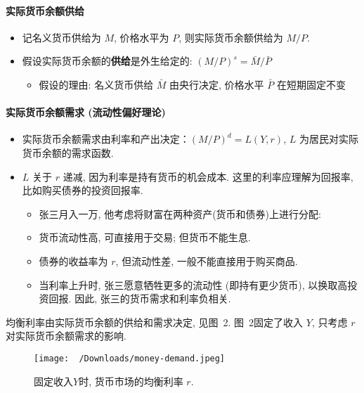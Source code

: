 \documentclass[11pt]{ctexart}
\begin{document}
\paragraph{实际货币余额供给}

\begin{itemize}
\item
  记名义货币供给为 $M$,  价格水平为 $P$,  则实际货币余额供给为 $M/P$.
\item
  假设实际货币余额的\textbf{供给}是外生给定的: $(M/P)^s = \bar{M}/ \bar{P}$
  \begin{itemize}
  \item
    假设的理由: 名义货币供给 $\bar{M}$ 由央行决定,  价格水平 $\bar{P}$ 在短期固定不变
  \end{itemize}
\end{itemize}

\paragraph{实际货币余额需求 (流动性偏好理论)}

\begin{itemize}
\item
  实际货币余额需求由利率和产出决定：$(M/P)^d = L(Y,  r)$, $L$ 为居民对实际货币余额的需求函数.
\item
  $L$ 关于 $r$ 递减, 因为利率是持有货币的机会成本. 这里的利率应理解为回报率, 比如购买债券的投资回报率.
  \begin{itemize}
  \item
    张三月入一万,  他考虑将财富在两种资产(货币和债券)上进行分配:
  \item
    货币流动性高, 可直接用于交易; 但货币不能生息.
  \item
    债券的收益率为 $r$,  但流动性差,  一般不能直接用于购买商品.
  \item
    当利率上升时, 张三愿意牺牲更多的流动性 (即持有更少货币),  以换取高投资回报. 因此, 张三的货币需求和利率负相关. 
  \end{itemize}
\end{itemize}

均衡利率由实际货币余额的供给和需求决定, 见图~2. 图~2固定了收入 $Y$,  只考虑 $r$ 对实际货币余额需求的影响.

\begin{center}
\begin{figure}[htbp]
\centering
\texttt{[image: ~/Downloads/money-demand.jpeg]}
\caption{\centering 固定收入$Y$时, 货币市场的均衡利率 $r$. }
\end{figure}  
\end{center}
\end{document}
